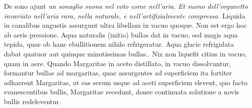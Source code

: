 \pstart {} De sono\protect{} ajunt \textit{un sonaglio suona nel  voto come nell'aria.} \textit{Et suono dell'organetto invariato nell'aria rara, nella naturale, e nell'artifizialmente compressa.}\pend \pstart {} Liquida in canalibus angustis assurgunt  ultra libellam in vacuo quoque. Non est ergo hoc ab aeris pressione\protect{}.\pend \pstart {} Aqua naturalis (initio) bullas dat  in vacuo, sed magis aqua tepida, quae ob hanc ebullitionem nihilo refrigeratur. Aqua glacie refrigidata dabat quatuor aut quinque minutissimas  bullas.\pend \pstart {}. Nix non liquefit citius in vacuo, quam in aere.\pend \pstart {} Quando Margaritae in aceto\protect{}  distillato, in vacuo dissolvuntur, formantur bullae ad margaritas, quae assurgentes ad superficiem ita fortiter adhaerent Margaritas, ut eas serum usque ad aceti\protect{} superficiem elevent,  quo facto evanescentibus bullis, Margaritae recedunt, donec continuata solutione  a novis bullis redeleventur.\pend \pstart 